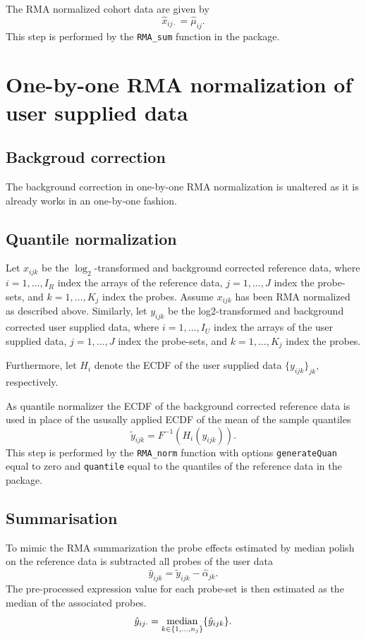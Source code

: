 The RMA normalized cohort data are given by
\begin{equation*}
   \hat{x}_{ij\cdot} = \hat{\mu}_{ij}.
\end{equation*}
This step is performed by the \texttt{RMA\_sum} function in the \hemaClass{} package.

\section{One-by-one RMA normalization of user supplied data}
\subsection{Backgroud correction}
The background correction in one-by-one RMA normalization is unaltered as it is already works in an one-by-one fashion.



\subsection{Quantile normalization}

Let $x_{ijk}$ be the $\log_2$-transformed and background corrected reference data, where $i = 1,\dots,I_R$ index the arrays of the reference data, $j=1,\dots,J$  index the probe-sets, and $k=1,\dots,K_j$ index the probes. Assume $x_{ijk}$ has been RMA normalized as described above. Similarly,  let $y_{ijk}$ be the log2-transformed and background corrected user supplied data, where $i = 1,\dots,I_U$ index the arrays of the user supplied data, $j=1,\dots,J$  index the probe-sets, and $k=1,\dots,K_j$ index the probes.

Furthermore, let $H_i$ denote the ECDF of the user supplied data $\{y_{ijk}\}_{jk}$, respectively.

As quantile normalizer the ECDF of the background corrected reference data is used in place of the ususally applied ECDF of the mean of the sample quantiles
\begin{equation*}
   \tilde{y}_{ijk} = F^{-1}(H_i(y_{ijk})).
\end{equation*}
This step is performed by the \texttt{RMA\_norm} function with options \texttt{generateQuan} equal to zero and \texttt{quantile} equal to the quantiles of the reference data in the \hemaClass{} package.


\subsection{Summarisation}
To mimic the RMA summarization the probe effects estimated by median polish on the reference data is subtracted all probes of the user data
\begin{equation*}
   \hat{y}_{ijk} = \tilde{y}_{ijk} - \hat{\alpha}_{jk}.
\end{equation*}
The pre-processed expression value for each probe-set is then estimated as the median of the associated probes.
\begin{equation*}
   \hat{y}_{ij\cdot} = \operatorname*{median}_{k \in \{1,\dots,n_j \}} \{ \hat{y}_{ijk} \}.
\end{equation*}


